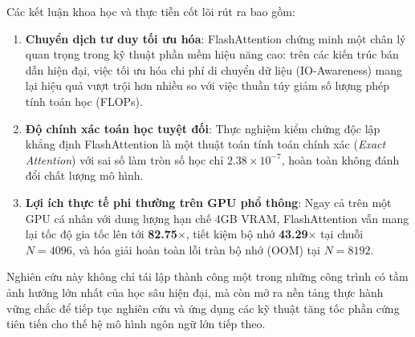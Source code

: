 \documentclass[10pt,a4paper]{article}
\begin{document}
Các kết luận khoa học và thực tiễn cốt lõi rút ra bao gồm:
\begin{enumerate}
    \item \textbf{Chuyển dịch tư duy tối ưu hóa}: FlashAttention chứng minh một chân lý quan trọng trong kỹ thuật phần mềm hiệu năng cao: trên các kiến trúc bán dẫn hiện đại, việc tối ưu hóa chi phí di chuyển dữ liệu (IO-Awareness) mang lại hiệu quả vượt trội hơn nhiều so với việc thuần túy giảm số lượng phép tính toán học (FLOPs).
    \item \textbf{Độ chính xác toán học tuyệt đối}: Thực nghiệm kiểm chứng độc lập khẳng định FlashAttention là một thuật toán tính toán chính xác (\textit{Exact Attention}) với sai số làm tròn số học chỉ $2.38 \times 10^{-7}$, hoàn toàn không đánh đổi chất lượng mô hình.
    \item \textbf{Lợi ích thực tế phi thường trên GPU phổ thông}: Ngay cả trên một GPU cá nhân với dung lượng hạn chế 4GB VRAM, FlashAttention vẫn mang lại tốc độ gia tốc lên tới \textbf{82.75$\times$}, tiết kiệm bộ nhớ \textbf{43.29$\times$} tại chuỗi $N=4096$, và hóa giải hoàn toàn lỗi tràn bộ nhớ (OOM) tại $N=8192$.
\end{enumerate}

Nghiên cứu này không chỉ tái lập thành công một trong những công trình có tầm ảnh hưởng lớn nhất của học sâu hiện đại, mà còn mở ra nền tảng thực hành vững chắc để tiếp tục nghiên cứu và ứng dụng các kỹ thuật tăng tốc phần cứng tiên tiến cho thế hệ mô hình ngôn ngữ lớn tiếp theo.
\end{document}
